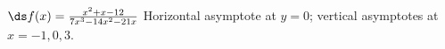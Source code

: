 {$\ds f(x)=\frac{x^2+x-12}{7 x^3-14 x^2-21 x}$
}
{Horizontal asymptote at $y=0$; vertical asymptotes at $x=-1,0,3$.
}
